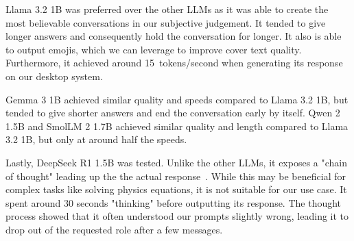 Llama 3.2 1B was preferred over the other \glspl{LLM} as it was able to create the most believable conversations in our subjective judgement. It tended to give longer answers and consequently hold the conversation for longer. It also is able to output emojis, which we can leverage to improve cover text quality. Furthermore, it achieved around 15~tokens/second when generating its response on our desktop system.

Gemma 3 1B achieved similar quality and speeds compared to Llama 3.2 1B, but tended to give shorter answers and end the conversation early by itself. Qwen 2 1.5B and SmolLM 2 1.7B achieved similar quality and length compared to Llama 3.2 1B, but only at around half the speeds.

Lastly, DeepSeek R1 1.5B was tested. Unlike the other \glspl{LLM}, it exposes a "chain of thought" leading up the the actual response~\cite{deepseek-aiDeepSeekR1IncentivizingReasoning2025}. While this may be beneficial for complex tasks like solving physics equations, it is not suitable for our use case. It spent around 30 seconds "thinking" before outputting its response. The thought process showed that it often understood our prompts slightly wrong, leading it to drop out of the requested role after a few messages.
